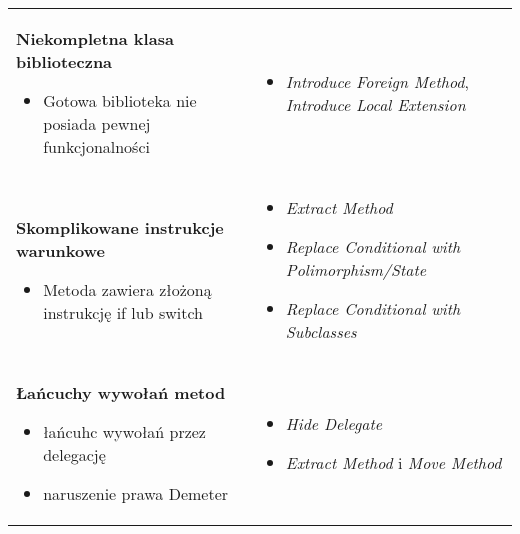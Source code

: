 \documentclass[../main.tex]{subfiles}
\begin{document}
\begin{table}[H]
\begin{center}
\begin{tabular}{ p{.35\linewidth} p{.65\linewidth} }
                \cmidrule(r){1-1}\cmidrule(l){2-2}
                \textbf{Niekompletna klasa biblioteczna}
                \begin{itemize}
                    \item Gotowa biblioteka nie posiada pewnej funkcjonalności
                \end{itemize}
                &
                \begin{itemize}
                    \item \textit{Introduce Foreign Method}, \textit{Introduce Local Extension}
                \end{itemize}
                \\

                \cmidrule(r){1-1}\cmidrule(l){2-2}
                \textbf{Skomplikowane instrukcje warunkowe}
                \begin{itemize}
                    \item Metoda zawiera złożoną instrukcję if lub switch
                \end{itemize}
                &
                \begin{itemize}
                    \item \textit{Extract Method}
                    \item \textit{Replace Conditional with Polimorphism/State}
                    \item \textit{Replace Conditional with Subclasses}
                \end{itemize}
                \\

                \cmidrule(r){1-1}\cmidrule(l){2-2}
                \textbf{Łańcuchy wywołań metod}
                \begin{itemize}
                    \item łańcuhc wywołań przez delegację
                    \item naruszenie prawa Demeter
                \end{itemize}
                &
                \begin{itemize}
                    \item \textit{Hide Delegate}
                    \item \textit{Extract Method} i \textit{Move Method}
                \end{itemize}
                \\

            \end{tabular}
        \end{center}
    \end{table}
\end{document}

